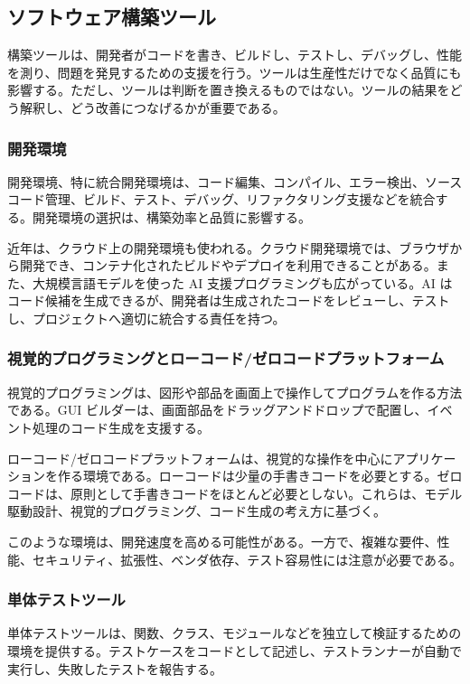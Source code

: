\documentclass[a4paper,11pt]{ltjsarticle}
\numberwithin{figure}{section}
\numberwithin{table}{section}
\begin{document}
\subsection{ソフトウェア構築ツール}

構築ツールは、開発者がコードを書き、ビルドし、テストし、デバッグし、性能を測り、問題を発見するための支援を行う。ツールは生産性だけでなく品質にも影響する。ただし、ツールは判断を置き換えるものではない。ツールの結果をどう解釈し、どう改善につなげるかが重要である。

\subsubsection{開発環境}

開発環境、特に統合開発環境は、コード編集、コンパイル、エラー検出、ソースコード管理、ビルド、テスト、デバッグ、リファクタリング支援などを統合する。開発環境の選択は、構築効率と品質に影響する。

近年は、クラウド上の開発環境も使われる。クラウド開発環境では、ブラウザから開発でき、コンテナ化されたビルドやデプロイを利用できることがある。また、大規模言語モデルを使った AI 支援プログラミングも広がっている。AI はコード候補を生成できるが、開発者は生成されたコードをレビューし、テストし、プロジェクトへ適切に統合する責任を持つ。

\subsubsection{視覚的プログラミングとローコード/ゼロコードプラットフォーム}

視覚的プログラミングは、図形や部品を画面上で操作してプログラムを作る方法である。GUI ビルダーは、画面部品をドラッグアンドドロップで配置し、イベント処理のコード生成を支援する。

ローコード/ゼロコードプラットフォームは、視覚的な操作を中心にアプリケーションを作る環境である。ローコードは少量の手書きコードを必要とする。ゼロコードは、原則として手書きコードをほとんど必要としない。これらは、モデル駆動設計、視覚的プログラミング、コード生成の考え方に基づく。

このような環境は、開発速度を高める可能性がある。一方で、複雑な要件、性能、セキュリティ、拡張性、ベンダ依存、テスト容易性には注意が必要である。

\subsubsection{単体テストツール}

単体テストツールは、関数、クラス、モジュールなどを独立して検証するための環境を提供する。テストケースをコードとして記述し、テストランナーが自動で実行し、失敗したテストを報告する。
\end{document}
